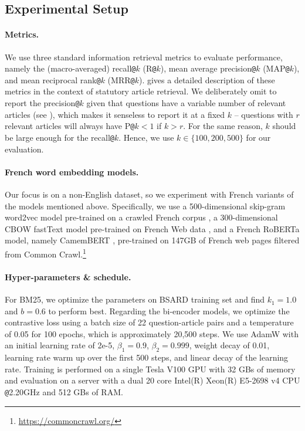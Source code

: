 \documentclass[11pt]{article}
\makeatletter
\newcommand{\at}{\texttt{@}}
\makeatother
\begin{document}
\subsection{Experimental Setup \label{subsec:experimental_setup}}
\paragraph{Metrics.}
We use three standard information retrieval metrics \citep{schutze2008introduction} to evaluate performance, namely the (macro-averaged) recall\at$k$ (R\at$k$), mean average precision\at$k$ (MAP\at$k$), and mean reciprocal rank\at$k$ (MRR\at$k$).  gives a detailed description of these metrics in the context of statutory article retrieval. We deliberately omit to report the precision\at$k$ given that questions have a variable number of relevant articles (see ), which makes it senseless to report it at a fixed $k$ -- questions with $r$ relevant articles will always have P\at$k < 1$ if $k > r$. For the same reason, $k$ should be large enough for the recall\at$k$. Hence, we use $k \in \{100, 200, 500\}$ for our evaluation.


\paragraph{French word embedding models.}
Our focus is on a non-English dataset, so we experiment with French variants of the models mentioned above. Specifically, we use a 500-dimensional skip-gram word2vec model pre-trained on a crawled French corpus \citep{fauconnier2015french}, a 300-dimensional CBOW fastText model pre-trained on French Web data \citep{grave2018learning}, and a French RoBERTa model, namely CamemBERT \citep{martin2019camembert}, pre-trained on 147GB of French web pages filtered from Common Crawl.\footnote{\url{https://commoncrawl.org/}}


\paragraph{Hyper-parameters \& schedule.}
For BM25, we optimize the parameters on BSARD training set and find $k_1=1.0$ and $b=0.6$ to perform best. Regarding the bi-encoder models, we optimize the contrastive loss using a batch size of 22 question-article pairs and a temperature of 0.05 for 100 epochs, which is approximately 20,500 steps. We use AdamW \citep{loshchilov2019decoupled} with an initial learning rate of 2e-5, $\beta_1=0.9$, $\beta_2=0.999$, weight decay of 0.01, learning rate warm up over the first 500 steps, and linear decay of the learning rate. Training is performed on a single Tesla V100 GPU with 32 GBs of memory and evaluation on a server with a dual 20 core Intel(R) Xeon(R) E5-2698 v4 CPU \at 2.20GHz and 512 GBs of RAM.
\end{document}

